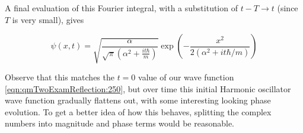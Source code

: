 A final evaluation of this Fourier integral, with a substitution of $t - T \rightarrow t$ (since $T$ is very small), gives

\begin{equation}\label{eqn:qmTwoExamReflection:310}
\psi(x, t) = 
\sqrt{\frac{\alpha}{\sqrt{\pi} \left( \alpha^2 + \frac{i t \hbar}{m} \right)}}
\exp\left(
-\frac{x^2}{2 \left(\alpha^2 + i t \hbar/m\right)}
\right)
\end{equation}

Observe that this matches the $t=0$ value of our wave function \ref{eqn:qmTwoExamReflection:250}, but over time this initial Harmonic oscillator wave function gradually flattens out, with some interesting looking phase evolution.  To get a better idea of how this behaves, splitting the complex numbers into magnitude and phase terms would be reasonable.


\EndArticle
